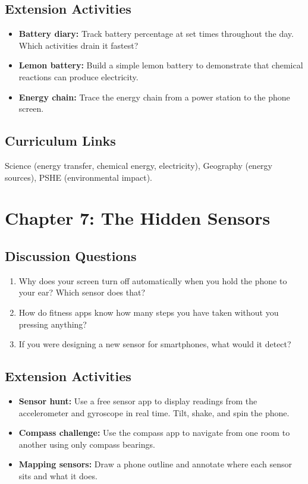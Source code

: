 \subsection*{Extension Activities}
\begin{itemize}
  \item \textbf{Battery diary:} Track battery percentage at set times throughout the day. Which activities drain it fastest?
  \item \textbf{Lemon battery:} Build a simple lemon battery to demonstrate that chemical reactions can produce electricity.
  \item \textbf{Energy chain:} Trace the energy chain from a power station to the phone screen.
\end{itemize}

\subsection*{Curriculum Links}
Science (energy transfer, chemical energy, electricity), Geography (energy sources), PSHE (environmental impact).

\sectionrule

\section*{Chapter 7: The Hidden Sensors}

\subsection*{Discussion Questions}
\begin{enumerate}
  \item Why does your screen turn off automatically when you hold the phone to your ear? Which sensor does that?
  \item How do fitness apps know how many steps you have taken without you pressing anything?
  \item If you were designing a new sensor for smartphones, what would it detect?
\end{enumerate}

\subsection*{Extension Activities}
\begin{itemize}
  \item \textbf{Sensor hunt:} Use a free sensor app to display readings from the accelerometer and gyroscope in real time. Tilt, shake, and spin the phone.
  \item \textbf{Compass challenge:} Use the compass app to navigate from one room to another using only compass bearings.
  \item \textbf{Mapping sensors:} Draw a phone outline and annotate where each sensor sits and what it does.
\end{itemize}

